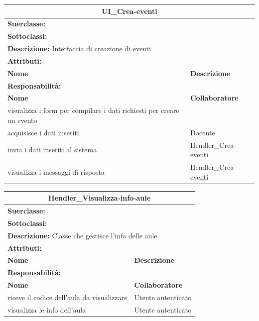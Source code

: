 \documentclass[11pt]{article}
\begin{document}
\begin{table}[H]
\centering
\begin{tabularx}{1\textwidth}{|X|X|}\hline
\multicolumn{2}{|c|}{\textbf{UI\_Crea-eventi}}\\\hline
\multicolumn{2}{|l|}{\textbf{Suerclasse:}}\\\hline
\multicolumn{2}{|l|}{\textbf{Sottoclassi:}}\\\hline
\multicolumn{2}{|l|}{\textbf{Descrizione:} Interfaccia di creazione di eventi}\\\hline
\multicolumn{2}{|l|}{\textbf{Attributi:}}\\
\textbf{Nome} & \textbf{Descrizione}\\
\hline
\multicolumn{2}{|l|}{\textbf{Responsabilità:}}\\
\textbf{Nome} & \textbf{Collaboratore}\\
visualizza i form per compilare i dati richiesti per creare un evento & \\
acquisisce i dati inseriti & Docente\\
invia i dati inseriti al sistema & Hendler\_Crea-eventi\\
visualizza i messaggi di risposta & Hendler\_Crea-eventi\\
\hline
\end{tabularx}
\end{table}


\begin{table}[H]
\centering
\begin{tabularx}{1\textwidth}{|X|X|}\hline
\multicolumn{2}{|c|}{\textbf{Hendler\_Visualizza-info-aule}}\\\hline
\multicolumn{2}{|l|}{\textbf{Suerclasse:}}\\\hline
\multicolumn{2}{|l|}{\textbf{Sottoclassi:}}\\\hline
\multicolumn{2}{|l|}{\textbf{Descrizione:} Classe che gestisce l'info delle aule}\\\hline
\multicolumn{2}{|l|}{\textbf{Attributi:}}\\
\textbf{Nome} & \textbf{Descrizione}\\
\hline
\multicolumn{2}{|l|}{\textbf{Responsabilità:}}\\
\textbf{Nome} & \textbf{Collaboratore}\\
riceve il codice dell'aula da visualizzare & Utente autenticato\\
visualizza le info dell'aula & Utente autenticato\\
\hline
\end{tabularx}
\end{table}
\end{document}
